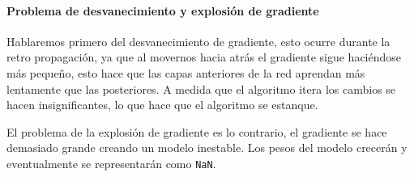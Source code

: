 \paragraph*{Problema de desvanecimiento y explosión de gradiente}
Hablaremos primero del desvanecimiento de gradiente, esto ocurre durante la retro propagación, ya que al movernos hacia atrás el gradiente sigue haciéndose más pequeño, esto hace que las capas anteriores de la red aprendan más lentamente que las posteriores. A medida que el algoritmo itera los cambios se hacen insignificantes, lo que hace que el algoritmo se estanque.

El problema de la explosión de gradiente es lo contrario, el gradiente se hace demasiado grande creando un modelo inestable. Los pesos del modelo crecerán y eventualmente se representarán como \texttt{NaN}.





